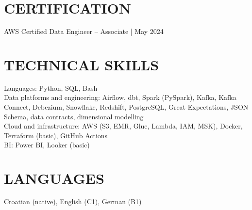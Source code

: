 \documentclass[11pt,a4paper]{article}
\begin{document}
\section*{CERTIFICATION}
AWS Certified Data Engineer -- Associate | May 2024

\section*{TECHNICAL SKILLS}
Languages: Python, SQL, Bash\\
Data platforms and engineering: Airflow, dbt, Spark (PySpark), Kafka, Kafka Connect, Debezium, Snowflake, Redshift, PostgreSQL, Great Expectations, JSON Schema, data contracts, dimensional modelling\\
Cloud and infrastructure: AWS (S3, EMR, Glue, Lambda, IAM, MSK), Docker, Terraform (basic), GitHub Actions\\
BI: Power BI, Looker (basic)

\section*{LANGUAGES}
Croatian (native), English (C1), German (B1)
\end{document}

